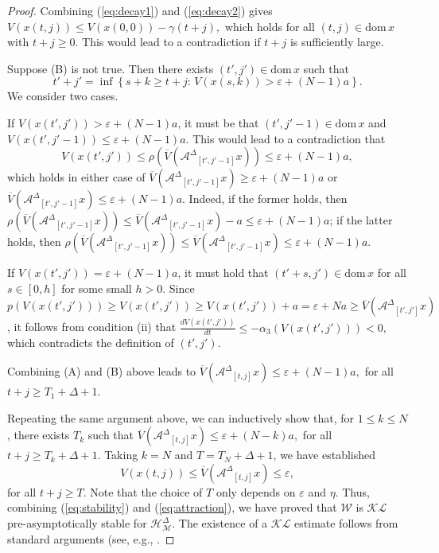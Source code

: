 \documentclass[journal,final,twocolumn]{IEEEtran}
\theoremstyle{definition}
\begin{document}
\begin{proof}
Combining (\ref{eq:decay1}) and (\ref{eq:decay2}) gives
$
V(x(t,j))\le V(x(0,0)) -\gamma(t+j),
$
which holds for all $(t,j)\in{\text{dom}\,} x$ with $t+j\ge 0$. This would lead to a contradiction if $t+j$ is sufficiently large.

Suppose (B) is not true. Then there exists $(t',j')\in {\text{dom}\,} x$ such that
$$
t'+j'=\inf{\left\{{s+k\ge t+j:\,V(x(s,k))>{\varepsilon}+(N-1)a}\right\}}.
$$
We consider two cases.

If $V(x(t',j'))>{\varepsilon}+(N-1)a$, it must be that $(t',j'-1)\in{\text{dom}\,} x$ and $V(x(t',j'-1))\le {\varepsilon}+(N-1)a$. This would lead to a contradiction that
$$
V(x(t',j'))\le \rho(\overline{V}({\mathcal{A}^{\Delta}}_{[t',j'-1]}x)) \le {\varepsilon}+(N-1)a,
$$
which holds in either case of $\overline{V}({\mathcal{A}^{\Delta}}_{[t',j'-1]}x)\ge {\varepsilon}+(N-1)a$ or $\overline{V}({\mathcal{A}^{\Delta}}_{[t',j'-1]}x)\le {\varepsilon}+(N-1)a$.
Indeed, if the former holds, then $\rho(\overline{V}({\mathcal{A}^{\Delta}}_{[t',j'-1]}x))\le \overline{V}({\mathcal{A}^{\Delta}}_{[t',j'-1]}x)-a \le {\varepsilon}+(N-1)a$; if the latter holds, then $\rho(\overline{V}({\mathcal{A}^{\Delta}}_{[t',j'-1]}x))\le \overline{V}({\mathcal{A}^{\Delta}}_{[t',j'-1]}x) \le {\varepsilon}+(N-1)a$.

If $V(x(t',j'))={\varepsilon}+(N-1)a$, it must hold that $(t'+s,j')\in{\text{dom}\,} x$ for all $s\in [0,h]$ for some small $h>0$. Since $p(V(x(t',j')))\ge V(x(t',j'))\ge V(x(t',j'))+a  = {\varepsilon}+Na\ge \overline{V}({\mathcal{A}^{\Delta}}_{[t',j']}x)$, it follows from condition (ii) that
$
\frac{dV(x(t',j'))}{dt}\le -\alpha_3(V(x(t',j')))<0,
$
which contradicts the definition of $(t',j')$.

Combining (A) and (B) above leads to
$
\overline{V}({\mathcal{A}^{\Delta}}_{[t,j]}x)\le {\varepsilon}+(N-1)a,
$
for all $t+j\ge T_1+\Delta+1$.

Repeating the same argument above, we can inductively show that, for $1\le k\le N$, there exists $T_k$ such that
$
\overline{V}({\mathcal{A}^{\Delta}}_{[t,j]}x)\le {\varepsilon}+(N-k)a,
$
for all $t+j\ge T_k+\Delta+1$. Taking $k=N$ and $T=T_N+\Delta+1$, we have established
\begin{equation}\label{eq:attraction}
V(x(t,j))\le\overline{V}({\mathcal{A}^{\Delta}}_{[t,j]}x)\le {\varepsilon},
\end{equation}
for all $t+j\ge T$. Note that the choice of $T$ only depends on ${\varepsilon}$ and $\eta$. Thus, combining (\ref{eq:stability}) and (\ref{eq:attraction}), we have proved that ${\mathcal{W}}$ is ${\mathcal{KL}}$ pre-asymptotically stable for ${\mathcal{H}_{\mathcal{M}}^{\Delta}}$. The existence of a ${\mathcal{KL}}$ estimate follows from standard arguments (see, e.g., \cite[Appendix C.6]{khalil1996nonlinear}.
\end{proof}
\end{document}
